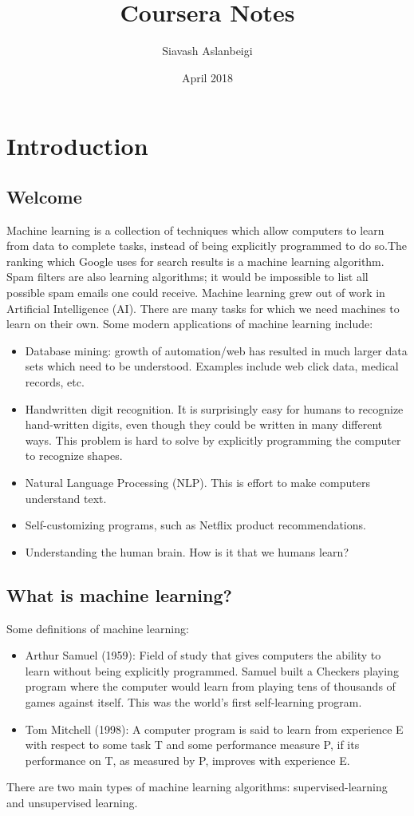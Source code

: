 \documentclass{article}
\title{Coursera Notes}
\author{Siavash Aslanbeigi}
\date{April 2018}
\theoremstyle{definition}
\begin{document}
\maketitle

\section{Introduction}
\subsection{Welcome}
Machine learning is a collection of techniques which allow computers to learn from data to complete tasks, instead of being explicitly programmed to do so.The ranking which Google uses for search results is a machine learning algorithm. Spam filters are also learning algorithms; it would be impossible to list all possible spam emails one could receive. Machine learning grew out of work in Artificial Intelligence (AI). There are many tasks for which we need machines to learn on their own. Some modern applications of machine learning include:
\begin{itemize}
    \item Database mining: growth of automation/web has resulted in much larger data sets which need to be understood. Examples include web click data, medical records, etc.
    \item Handwritten digit recognition. It is surprisingly easy for humans to recognize hand-written digits, even though they could be written in many different ways. This problem is hard to solve by explicitly programming the computer to recognize shapes.
    \item Natural Language Processing (NLP). This is effort to make computers understand text.
    \item Self-customizing programs, such as Netflix product recommendations.
    \item Understanding the human brain. How is it that we humans learn?
\end{itemize}

\subsection{What is machine learning?}
Some definitions of machine learning:
\begin{itemize}
    \item Arthur Samuel (1959): Field of study that gives computers the ability to learn without being explicitly programmed. Samuel built a Checkers playing program where the computer would learn from playing tens of thousands of games against itself. This was the world's first self-learning program.
    \item Tom Mitchell (1998): A computer program is said to learn from experience E with respect to some task T and some performance measure P, if its performance on T, as measured by P, improves with experience E.
\end{itemize}
There are two main types of machine learning algorithms: supervised-learning and unsupervised learning.
\end{document}
